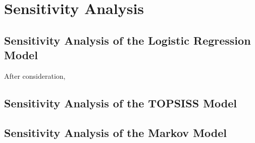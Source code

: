 \MinParskip{}

\section{Sensitivity Analysis}


\subsection{Sensitivity Analysis of the Logistic Regression Model}

After consideration, 

\subsection{Sensitivity Analysis of the TOPSISS Model}

\subsection{Sensitivity Analysis of the Markov Model}
